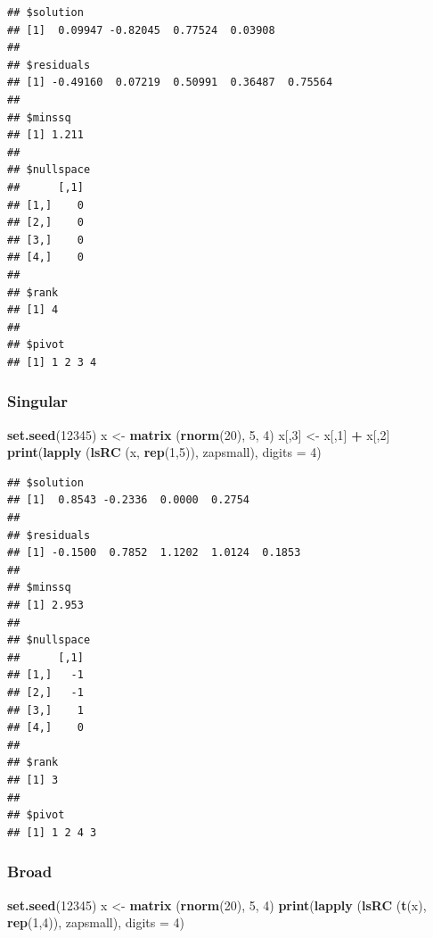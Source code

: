 \documentclass[12pt,]{article}
\newenvironment{Shaded}{\begin{snugshade}}{\end{snugshade}}
\newcommand{\KeywordTok}[1]{\textcolor[rgb]{0.13,0.29,0.53}{\textbf{#1}}}
\newcommand{\DataTypeTok}[1]{\textcolor[rgb]{0.13,0.29,0.53}{#1}}
\newcommand{\DecValTok}[1]{\textcolor[rgb]{0.00,0.00,0.81}{#1}}
\newcommand{\StringTok}[1]{\textcolor[rgb]{0.31,0.60,0.02}{#1}}
\newcommand{\OperatorTok}[1]{\textcolor[rgb]{0.81,0.36,0.00}{\textbf{#1}}}
\newcommand{\NormalTok}[1]{#1}
\begin{document}
\begin{verbatim}
## $solution
## [1]  0.09947 -0.82045  0.77524  0.03908
## 
## $residuals
## [1] -0.49160  0.07219  0.50991  0.36487  0.75564
## 
## $minssq
## [1] 1.211
## 
## $nullspace
##      [,1]
## [1,]    0
## [2,]    0
## [3,]    0
## [4,]    0
## 
## $rank
## [1] 4
## 
## $pivot
## [1] 1 2 3 4
\end{verbatim}

\subsubsection{Singular}\label{singular-1}

\begin{Shaded}
\begin{Highlighting}[]
\KeywordTok{set.seed}\NormalTok{(}\DecValTok{12345}\NormalTok{)}
\NormalTok{x <-}\StringTok{ }\KeywordTok{matrix}\NormalTok{ (}\KeywordTok{rnorm}\NormalTok{(}\DecValTok{20}\NormalTok{), }\DecValTok{5}\NormalTok{, }\DecValTok{4}\NormalTok{)}
\NormalTok{x[,}\DecValTok{3}\NormalTok{] <-}\StringTok{ }\NormalTok{x[,}\DecValTok{1}\NormalTok{] }\OperatorTok{+}\StringTok{ }\NormalTok{x[,}\DecValTok{2}\NormalTok{]}
\KeywordTok{print}\NormalTok{(}\KeywordTok{lapply}\NormalTok{ (}\KeywordTok{lsRC}\NormalTok{ (x, }\KeywordTok{rep}\NormalTok{(}\DecValTok{1}\NormalTok{,}\DecValTok{5}\NormalTok{)), zapsmall), }\DataTypeTok{digits =} \DecValTok{4}\NormalTok{)}
\end{Highlighting}
\end{Shaded}

\begin{verbatim}
## $solution
## [1]  0.8543 -0.2336  0.0000  0.2754
## 
## $residuals
## [1] -0.1500  0.7852  1.1202  1.0124  0.1853
## 
## $minssq
## [1] 2.953
## 
## $nullspace
##      [,1]
## [1,]   -1
## [2,]   -1
## [3,]    1
## [4,]    0
## 
## $rank
## [1] 3
## 
## $pivot
## [1] 1 2 4 3
\end{verbatim}

\subsubsection{Broad}\label{broad-1}

\begin{Shaded}
\begin{Highlighting}[]
\KeywordTok{set.seed}\NormalTok{(}\DecValTok{12345}\NormalTok{)}
\NormalTok{x <-}\StringTok{ }\KeywordTok{matrix}\NormalTok{ (}\KeywordTok{rnorm}\NormalTok{(}\DecValTok{20}\NormalTok{), }\DecValTok{5}\NormalTok{, }\DecValTok{4}\NormalTok{)}
\KeywordTok{print}\NormalTok{(}\KeywordTok{lapply}\NormalTok{ (}\KeywordTok{lsRC}\NormalTok{ (}\KeywordTok{t}\NormalTok{(x), }\KeywordTok{rep}\NormalTok{(}\DecValTok{1}\NormalTok{,}\DecValTok{4}\NormalTok{)), zapsmall), }\DataTypeTok{digits =} \DecValTok{4}\NormalTok{)}
\end{Highlighting}
\end{Shaded}
\end{document}

